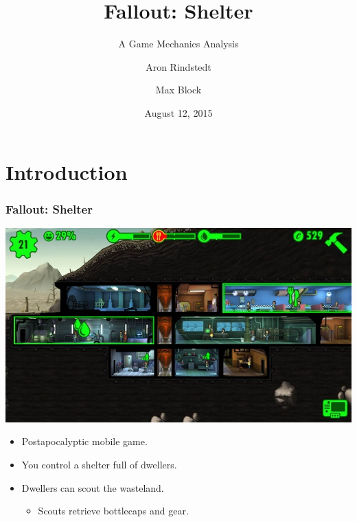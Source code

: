\documentclass{beamer}
\title{Fallout: Shelter}
\subtitle{A Game Mechanics Analysis}
\author{Aron Rindstedt \and Max Block}
\date{August 12, 2015}
\begin{document}
\maketitle

\section{Introduction}
\begin{frame}
  \frametitle{Fallout: Shelter}
  \centering
  \includegraphics[scale=.3]{Fallout_Shelter_gameplay}
  \begin{itemize}
  \item Postapocalyptic mobile game.
  \item You control a shelter full of dwellers.
  \item Dwellers can scout the wasteland.
  \begin{itemize}
  \item Scouts retrieve bottlecaps and gear.
  \end{itemize}
  \end{itemize}
\end{frame}
\end{document}
